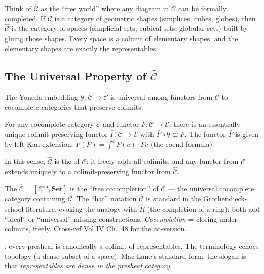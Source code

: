 \begin{dialog}
Think of $\hat{\mathcal{C}}$ as the ``free world'' where any diagram in
$\mathcal{C}$ can be formally completed. If $\mathcal{C}$ is a category
of geometric shapes (simplices, cubes, globes), then $\hat{\mathcal{C}}$
is the category of spaces (simplicial sets, cubical sets, globular sets)
built by gluing those shapes. Every space is a colimit of elementary
shapes, and the elementary shapes are exactly the representables.
\end{dialog}

\subsection{The Universal Property of $\hat{\mathcal{C}}$}

The Yoneda embedding $\mathcal{Y}: \mathcal{C} \to \hat{\mathcal{C}}$
is universal among functors from $\mathcal{C}$ to cocomplete categories
that preserve colimits:

\begin{theorem}
For any cocomplete category $\mathcal{E}$ and functor $F: \mathcal{C}
\to \mathcal{E}$, there is an essentially unique colimit-preserving functor
$\bar F: \hat{\mathcal{C}} \to \mathcal{E}$ with $\bar F \circ \mathcal{Y}
\cong F$. The functor $\bar F$ is given by left Kan extension:
$\bar F(P) = \int^c P(c) \cdot Fc$ (the coend formula).
\end{theorem}

In this sense, $\hat{\mathcal{C}}$ is the  of
$\mathcal{C}$: it freely adds all colimits, and any functor from
$\mathcal{C}$ extends uniquely to a colimit-preserving functor from
$\hat{\mathcal{C}}$.


\begin{nameorigin}
The  $\widehat{\mathcal{C}} = [\mathcal{C}^{\mathrm{op}},
\mathbf{Set}]$ is the ``free cocompletion'' of $\mathcal{C}$ — the
universal cocomplete category containing $\mathcal{C}$. The
``hat'' notation $\widehat{\mathcal{C}}$ is standard in the
Grothendieck-school literature, evoking the analogy with $\widehat{R}$
(the completion of a ring): both add ``ideal'' or ``universal'' missing
constructions. \emph{Cocompletion} = closing under colimits, freely.
Cross-ref Vol IV Ch.~48 for the $\infty$-version.

: every presheaf is canonically a colimit of
representables. The terminology echoes topology (a dense subset of a
space). Mac Lane's standard form; the slogan is that
\emph{representables are dense in the presheaf category}.
\end{nameorigin}

